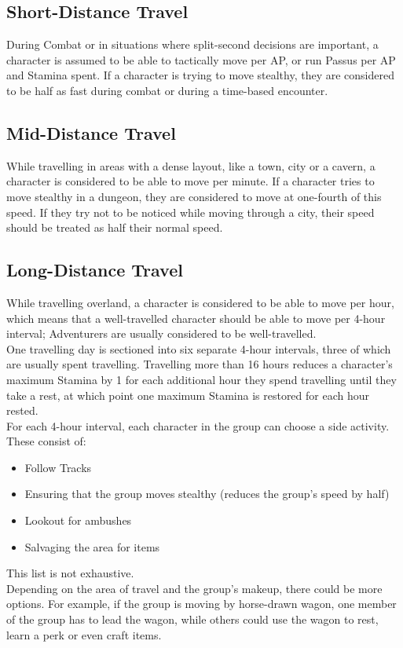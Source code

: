 \subsection{Short-Distance Travel}
During Combat or in situations where split-second decisions are important, a character is assumed to be able to tactically move  per AP, or run  Passus per AP and Stamina spent. If a character is trying to move stealthy, they are considered to be half as fast during combat or during a time-based encounter.\\

\subsection{Mid-Distance Travel}
While travelling in areas with a dense layout, like a town, city or a cavern, a character is considered to be able to move  per minute. If a character tries to move stealthy in a dungeon, they are considered to move at one-fourth of this speed. If they try not to be noticed while moving through a city, their speed should be treated as half their normal speed.\\

\subsection{Long-Distance Travel}
While travelling overland, a character is considered to be able to move  per hour, which means that a well-travelled character should be able to move  per 4-hour interval; Adventurers are usually considered to be well-travelled.\\

One travelling day is sectioned into six separate 4-hour intervals, three of which are usually spent travelling. Travelling more than 16 hours reduces a character's maximum Stamina by 1 for each additional hour they spend travelling until they take a rest, at which point one maximum Stamina is restored for each hour rested.\\

For each 4-hour interval, each character in the group can choose a side activity. These consist of:
\begin{itemize}
	\item Follow Tracks
	
	\item Ensuring that the group moves stealthy (reduces the group's speed by half)
	
	\item Lookout for ambushes
	
	\item Salvaging the area for items
	
\end{itemize}
This list is not exhaustive.\\

Depending on the area of travel and the group's makeup, there could be more options. For example, if the group is moving by horse-drawn wagon, one member of the group has to lead the wagon, while others could use the wagon to rest, learn a perk or even craft items.
